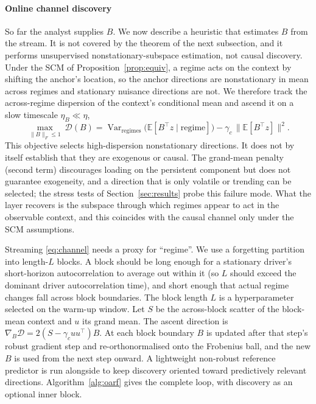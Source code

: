 \documentclass[authoryear,preprint,12pt]{elsarticle}
\theoremstyle{plain}
\theoremstyle{remark}
\newcommand{\E}{\mathbb{E}}
\DeclareMathOperator*{\Var}{Var}
\begin{document}
\paragraph{Online channel discovery}
So far the analyst supplies $B$. We now describe a heuristic that estimates $B$ from
the stream. It is not covered by the theorem of the next subsection, and it performs
unsupervised nonstationary-subspace estimation, not causal discovery. Under the SCM of
Proposition~\ref{prop:equiv}, a regime acts on the context by shifting the anchor's
location, so the anchor directions are nonstationary in mean across regimes and
stationary nuisance directions are not. We therefore track the across-regime
dispersion of the context's conditional mean and ascend it on a slow timescale
$\eta_B\ll\eta$,
\begin{equation}\label{eq:channel}
\max_{\|B\|_F\le 1}\ \mathcal{D}(B)=\Var_{\text{regimes}}\!\big(\E[B^\top z\mid\text{regime}]\big)
 -\gamma_c\,\big\|\E[B^\top z]\big\|^2 .
\end{equation}
This objective selects high-dispersion nonstationary directions. It does not by itself
establish that they are exogenous or causal. The grand-mean penalty (second term)
discourages loading on the persistent component but does not guarantee exogeneity,
and a direction that is only volatile or trending can be selected; the stress tests of
Section~\ref{sec:results} probe this failure mode. What the layer recovers is the
subspace through which regimes appear to act in the observable context, and this
coincides with the causal channel only under the SCM assumptions.

Streaming \eqref{eq:channel} needs a proxy for ``regime''. We use a forgetting
partition into length-$L$ blocks. A block should be long enough for a stationary
driver's short-horizon autocorrelation to average out within it (so $L$ should exceed
the dominant driver autocorrelation time), and short enough that actual regime changes
fall across block boundaries. The block length $L$ is a hyperparameter selected on the warm-up window. Let $S$ be
the across-block scatter of the block-mean context and $u$ its grand mean. The ascent
direction is $\nabla_B\mathcal{D}=2(S-\gamma_c uu^\top)B$. At each block boundary $B$
is updated after that step's robust gradient step and re-orthonormalised onto the
Frobenius ball, and the new $B$ is used from the next step onward. A lightweight
non-robust reference predictor is run alongside to keep discovery oriented toward
predictively relevant directions. Algorithm~\ref{alg:oarf} gives the complete loop,
with discovery as an optional inner block.
\end{document}

